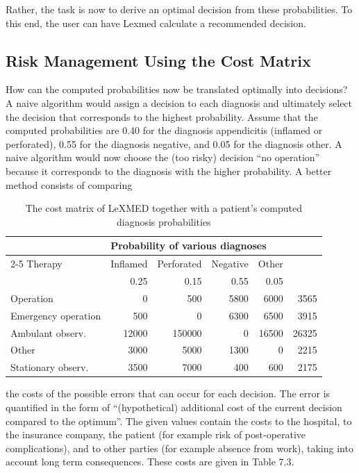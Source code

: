 \documentclass[10pt]{book}
\begin{document}
Rather, the task is now to derive an optimal decision from these probabilities. To this end, the user can have Lexmed calculate a recommended decision.

\subsection{Risk Management Using the Cost Matrix}
How can the computed probabilities now be translated optimally into decisions? A naive algorithm would assign a decision to each diagnosis and ultimately select the decision that corresponds to the highest probability. Assume that the computed probabilities are 0.40 for the diagnosis appendicitis (inflamed or perforated), 0.55 for the diagnosis negative, and 0.05 for the diagnosis other. A naive algorithm would now choose the (too risky) decision ``no operation'' because it corresponds to the diagnosis with the higher probability. A better method consists of comparing

\begin{table}[t]
\centering
\caption{The cost matrix of LeXMED together with a patient's computed diagnosis probabilities}
\begin{tabular}{lrrrrr}
\hline
 & \multicolumn{4}{l}{Probability of various diagnoses} & \\
\cline{2-5}
Therapy & Inflamed & Perforated & Negative & Other & \\
 & 0.25 & 0.15 & 0.55 & 0.05 & \\
\hline
Operation & 0 & 500 & 5800 & 6000 & 3565 \\
Emergency operation & 500 & 0 & 6300 & 6500 & 3915 \\
Ambulant observ. & 12000 & 150000 & 0 & 16500 & 26325 \\
Other & 3000 & 5000 & 1300 & 0 & 2215 \\
Stationary observ. & 3500 & 7000 & 400 & 600 & 2175 \\
\hline
\end{tabular}
\end{table}

the costs of the possible errors that can occur for each decision. The error is quantified in the form of ``(hypothetical) additional cost of the current decision compared to the optimum''. The given values contain the costs to the hospital, to the insurance company, the patient (for example risk of post-operative complications), and to other parties (for example absence from work), taking into account long term consequences. These costs are given in Table 7.3.
\end{document}
